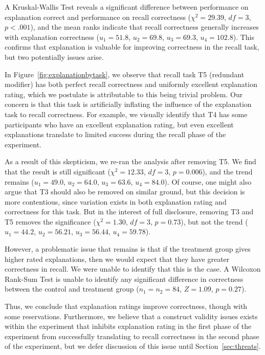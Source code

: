 \documentclass[conference]{IEEEtran}
\begin{document}
A Kruskal-Wallis Test reveals a significant difference between performance on explanation correct and performance on recall correctness ($\chi^2 = 29.39$, $df = 3$, $p < .001$), and the mean ranks indicate that recall correctness generally increases with explanation correctness ($u_1 = 51.8$, $u_2 = 69.8$, $u_3 = 69.3$, $u_4 = 102.8$). This confirms that explanation is valuable for improving correctness in the recall task, but two potentially issues arise.

In Figure~\ref{fig:explanationbytask}, we observe that recall task T5 (redundant modifier) has both perfect recall correctness and uniformly excellent explanation rating, which we postulate is attributable to this being trivial problem. Our concern is that this task is artificially inflating the influence of the explanation task to recall correctness. For example, we visually identify that T4 has some participants who have an excellent explanation rating, but even excellent explanations translate to limited success during the recall phase of the experiment.

As a result of this skepticism, we re-ran the analysis after removing T5. We find that the result is still significant ($\chi^2 = 12.33$, $df = 3$, $p = 0.006$), and the trend remains ($u_1 = 49.0$, $u_2 = 64.0$, $u_3 = 63.6$, $u_4 = 84.0$). Of course, one might also argue that T3 should also be removed on similar ground, but this decision is more contentious, since variation exists in both explanation rating and correctness for this task. But in the interest of full disclosure, removing T3 and T5 removes the significance ($\chi^2 = 1.30$, $df = 3$, $p = 0.73$), but not the trend ($u_1 = 44.2$, $u_2 = 56.21$, $u_3 = 56.44$, $u_4 = 59.78$). 

However, a problematic issue that remains is that if the treatment group gives higher rated explanations, then we would expect that they have greater correctness in recall. We were unable to identify that this is the case. A Wilcoxon Rank-Sum Test is unable to identify any significant difference in correctness between the control and treatment group ($n_1 = n_2 = 84$, $Z = 1.09$, $p = 0.27$).

Thus, we conclude that explanation ratings improve correctness, though with some reservations. Furthermore, we believe that a construct validity issues exists within the experiment that inhibits explanation rating in the first phase of the experiment from successfully translating to recall correctness in the second phase of the experiment, but we defer discussion of this issue until Section~\ref{sec:threats}.
\end{document}
